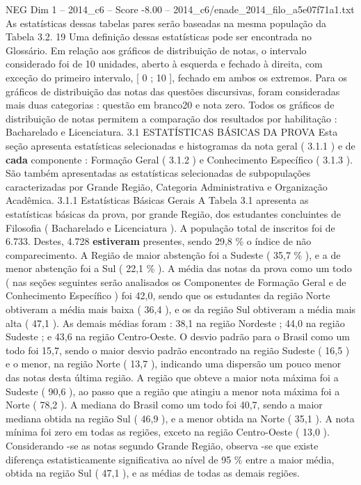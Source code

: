 \begin{textsample}{NEG Dim 1 – 2014\_c6 – Score -8.00 – 2014\_c6/enade\_2014\_filo\_a5e07f71a1.txt}
As estatísticas dessas tabelas pares serão baseadas na mesma população da Tabela 3.2. 19 Uma definição dessas estatísticas pode ser encontrada no Glossário.
Em relação aos gráficos de distribuição de notas, o intervalo considerado foi de 10 unidades, aberto à esquerda e fechado à direita, com exceção do primeiro intervalo, [ 0 ; 10 ], fechado em ambos os extremos.
Para os gráficos de distribuição das notas das questões discursivas, foram consideradas mais duas categorias : questão em branco20 e nota zero.
Todos os gráficos de distribuição de notas permitem a comparação dos resultados por habilitação : Bacharelado e Licenciatura. 3.1 ESTATÍSTICAS BÁSICAS DA PROVA Esta seção apresenta estatísticas selecionadas e histogramas da nota geral ( 3.1.1 ) e de \textbf{cada} componente : Formação Geral ( 3.1.2 ) e Conhecimento Específico ( 3.1.3 ).
São também apresentadas as estatísticas selecionadas de subpopulações caracterizadas por Grande Região, Categoria Administrativa e Organização Acadêmica. 3.1.1 Estatísticas Básicas Gerais A Tabela 3.1 apresenta as estatísticas básicas da prova, por grande Região, dos estudantes concluintes de Filosofia ( Bacharelado e Licenciatura ).
A população total de inscritos foi de 6.733.
Destes, 4.728 \textbf{estiveram} presentes, sendo 29,8 \% o índice de não comparecimento.
A Região de maior abstenção foi a Sudeste ( 35,7 \% ), e a de menor abstenção foi a Sul ( 22,1 \% ).
A média das notas da prova como um todo ( nas seções seguintes serão analisados os Componentes de Formação Geral e de Conhecimento Específico ) foi 42,0, sendo que os estudantes da região Norte obtiveram a média mais baixa ( 36,4 ), e os da região Sul obtiveram a média mais alta ( 47,1 ).
As demais médias foram : 38,1 na região Nordeste ; 44,0 na região Sudeste ; e 43,6 na região Centro-Oeste.
O desvio padrão para o Brasil como um todo foi 15,7, sendo o maior desvio padrão encontrado na região Sudeste ( 16,5 ) e o menor, na região Norte ( 13,7 ), indicando uma dispersão um pouco menor das notas desta última região.
A região que obteve a maior nota máxima foi a Sudeste ( 90,6 ), ao passo que a região que atingiu a menor nota máxima foi a Norte ( 78,2 ).
A mediana do Brasil como um todo foi 40,7, sendo a maior mediana obtida na região Sul ( 46,9 ), e a menor obtida na Norte ( 35,1 ).
A nota mínima foi zero em todas as regiões, exceto na região Centro-Oeste ( 13,0 ).
Considerando -se as notas segundo Grande Região, observa -se que existe diferença estatisticamente significativa ao nível de 95 \% entre a maior média, obtida na região Sul ( 47,1 ), e as médias de todas as demais regiões.

\end{textsample}
